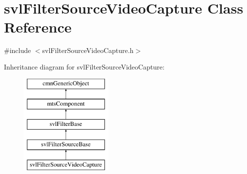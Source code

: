 \hypertarget{classsvl_filter_source_video_capture}{\section{svl\-Filter\-Source\-Video\-Capture Class Reference}
\label{classsvl_filter_source_video_capture}
}


{\ttfamily \#include $<$svl\-Filter\-Source\-Video\-Capture.\-h$>$}

Inheritance diagram for svl\-Filter\-Source\-Video\-Capture\-:\begin{figure}[H]
\begin{center}
\leavevmode
\includegraphics[height=5.000000cm]{d2/d57/classsvl_filter_source_video_capture}
\end{center}
\end{figure}
